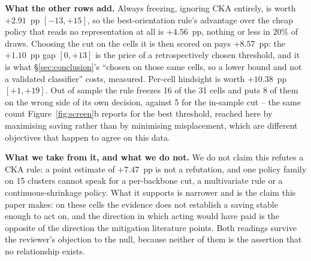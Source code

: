 \textbf{What the other rows add.}  Always freezing, ignoring CKA entirely, is worth
$+2.91$~pp $[-13, +15]$, so the best-orientation rule's advantage over the cheap
policy that reads no representation at all is $+4.56$~pp, nothing or less in $20\%$
of draws.  Choosing the cut on the cells it is then scored on pays $+8.57$~pp: the
$+1.10$~pp gap $[0, +13]$ is the price of a retrospectively chosen threshold, and it
is what \S\ref{sec:conclusion}'s ``chosen on those same cells, so a lower bound and
not a validated classifier'' costs, measured.  Per-cell hindsight is worth
$+10.38$~pp $[+1, +19]$.  Out of sample the rule freezes 16 of the 31 cells and puts
8 of them on the wrong side of its own decision, against 5 for the in-sample cut --
the same count Figure~\ref{fig:screen}b reports for the best threshold, reached
here by maximising saving rather than by minimising misplacement, which are
different objectives that happen to agree on this data.

\textbf{What we take from it, and what we do not.}  We do not claim this refutes a
CKA rule: a point estimate of $+7.47$~pp is not a refutation, and one policy family
on 15 clusters cannot speak for a per-backbone cut, a multivariate rule or a
continuous-shrinkage policy.  What it supports is narrower and is the claim this
paper makes: on these cells the evidence does not establish a saving stable enough
to act on, and the direction in which acting would have paid is the opposite of the
direction the mitigation literature points.  Both readings survive the reviewer's
objection to the null, because neither of them is the assertion that no relationship
exists.



